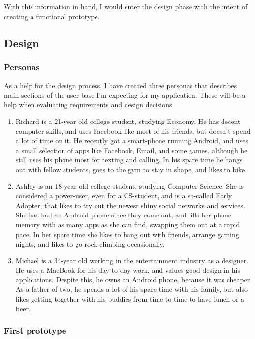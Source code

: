 \documentclass[]{report}
\begin{document}
With this information in hand, I would enter the design phase with the intent of
creating a functional prototype.

\subsection{Design}

\subsubsection{Personas}

As a help for the design process, I have created three personas that describes
main sections of the user base I'm expecting for my application. These will be a
help when evaluating requirements and design decisions.

\begin{enumerate}
\item Richard is a 21-year old college student, studying Economy. He has decent
  computer skills, and uses Facebook like most of his friends, but doesn't spend
  a lot of time on it. He recently got a smart-phone running Android, and uses a
  small selection of apps like Facebook, Email, and some games, although he
  still uses his phone most for texting and calling. In his spare time he hangs
  out with fellow students, goes to the gym to stay in shape, and likes to bike.
\item Ashley is an 18-year old college student, studying Computer Science. She
  is considered a power-user, even for a CS-student, and is a so-called Early
  Adopter, that likes to try out the newest shiny social networks and
  services. She has had an Android phone since they came out, and fills her
  phone memory with as many apps as she can find, swapping them out at a rapid
  pace. In her spare time she likes to hang out with friends, arrange gaming
  nights, and likes to go rock-climbing occasionally.
\item Michael is a 34-year old working in the entertainment industry as a
  designer. He uses a MacBook for his day-to-day work, and values good design in
  his applications. Despite this, he owns an Android phone, because it was
  cheaper. As a father of two, he spends a lot of his spare time with his
  family, but also likes getting together with his buddies from time to time to
  have lunch or a beer.
\end{enumerate}

\subsubsection{First prototype}
\end{document}
